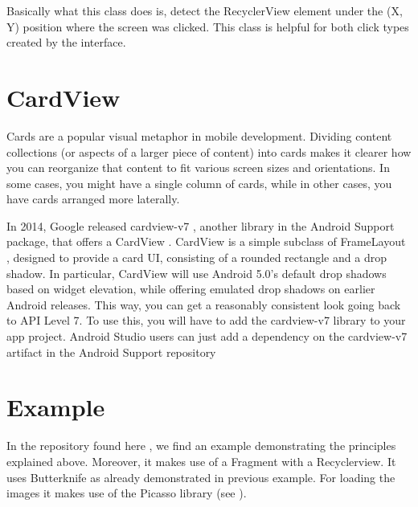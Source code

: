 Basically what this class does is, detect the RecyclerView element under the (X, Y) position where the screen was clicked. This class is helpful for both click types created by the interface.


\section{CardView}
Cards are a popular visual metaphor in mobile development. Dividing content collections (or aspects of a larger piece of content) into cards makes it clearer how you can reorganize that content to fit various screen sizes and orientations. In some cases, you might have a single column of cards, while in other cases, you have cards
arranged more laterally.

In 2014, Google released cardview-v7 , another library in the Android Support
package, that offers a CardView . CardView is a simple subclass of FrameLayout ,
designed to provide a card UI, consisting of a rounded rectangle and a drop shadow.
In particular, CardView will use Android 5.0’s default drop shadows based on widget
elevation, while offering emulated drop shadows on earlier Android releases. This
way, you can get a reasonably consistent look going back to API Level 7.
To use this, you will have to add the cardview-v7 library to your app project.
Android Studio users can just add a dependency on the cardview-v7 artifact in the
Android Support repository

\section{Example}

\begin{example}
	In the repository found here \cite{Buysse2017}, we find an example demonstrating the principles explained above. Moreover, it makes use of a Fragment with a Recyclerview. It uses Butterknife as already demonstrated in previous example. For loading the images it makes use of the Picasso library (see \cite{Square2017}). 
\end{example}

\newpage
